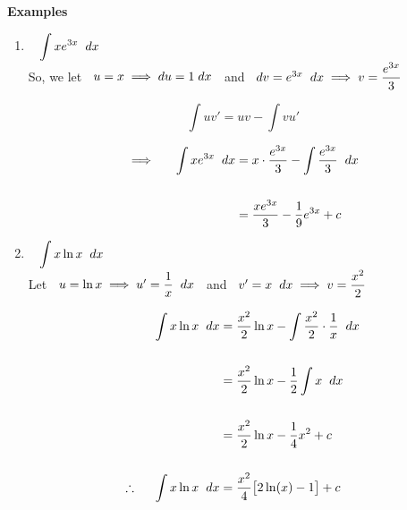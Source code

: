 \documentclass[11pt,a4paper]{article}
\begin{document}
\pagebreak
\textbf{Examples}
\begin{enumerate}
\item $\hspace{0.3cm}\displaystyle{\int xe^{3x}\hspace{0.2cm}dx}$\\

So, we let $\hspace{0.2cm} u = x \implies du = 1\hspace{0.1cm} dx\hspace{0.2cm}$ and $\hspace{0.2cm} dv = e^{3x}\hspace{0.2cm}dx \implies v = \dfrac{e^{3x}}{3}$ 

$$\int uv' = uv - \int v u'$$

\begin{align*}
\implies \hspace{0.5cm} \int xe^{3x}\hspace{0.2cm}dx & = x\cdot\dfrac{e^{3x}}{3} - \int \dfrac{e^{3x}}{3}\hspace{0.2cm}dx\\\\
& = \dfrac{xe^{3x}}{3}-\dfrac{1}{9}e^{3x} + c\\
\end{align*}




\item $\hspace{0.3cm} \displaystyle{\int x \ln x \hspace{0.2cm}dx}$\\

Let $\hspace{0.2cm} u = \ln x \implies u' = \dfrac{1}{x}\hspace{0.2cm}dx\hspace{0.2cm}$ and $\hspace{0.2cm}  v' = x\hspace{0.2cm}dx \implies v = \dfrac{x^2}{2}$

\begin{align*}
\int x \ln x \hspace{0.2cm}dx & = \dfrac{x^2}{2}\ln x - \int \dfrac{x^2}{2}\cdot \dfrac{1}{x}\hspace{0.2cm}dx\\\\
& = \dfrac{x^2}{2}\ln x - \dfrac{1}{2}\int x\hspace{0.2cm}dx\\\\
& = \dfrac{x^2}{2}\ln x - \dfrac{1}{4}x^2 + c\\\\
\therefore\hspace{0.5cm} \int x \ln x \hspace{0.2cm}dx & = \dfrac{x^2}{4}\big[2\ln(x) - 1\big] + c\\
\end{align*}







\end{enumerate}
\end{document}
